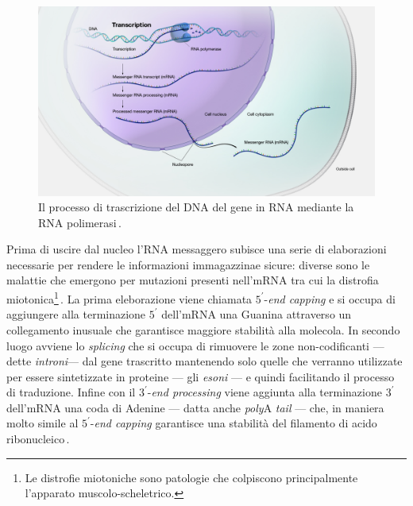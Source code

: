 \begin{figure}[b!]
    \centering
    \includegraphics[width=\textwidth]{assets/dna-transcription.jpg}
    \caption[Il processo di trascrizione del DNA in RNA.]{Il processo di trascrizione del DNA del gene in RNA mediante la RNA polimerasi\,\cite{nhgri_transcription_image}.}\label{fig:dna-transcription}
\end{figure}

Prima di uscire dal nucleo l'RNA messaggero subisce una serie di elaborazioni necessarie per rendere le informazioni immagazzinae sicure: diverse sono le malattie che emergono per mutazioni presenti nell'mRNA tra cui la distrofia miotonica\footnote{Le distrofie miotoniche sono patologie che colpiscono principalmente l'apparato muscolo-scheletrico.}\,\cite{philips2000rna}. La prima eleborazione viene chiamata $5^\prime$-\textit{end capping} e si occupa di aggiungere alla terminazione $5^\prime$ dell'mRNA una Guanina attraverso un collegamento inusuale che garantisce maggiore stabilità alla molecola. In secondo luogo avviene lo \textit{splicing} che si occupa di rimuovere le zone non-codificanti — dette \textsl{introni}— dal gene trascritto mantenendo solo quelle che verranno utilizzate per essere sintetizzate in proteine — gli \textsl{esoni} — e quindi facilitando il processo di traduzione. Infine con il $3^\prime$-\textit{end processing} viene aggiunta alla terminazione $3^\prime$ dell'mRNA una coda di Adenine — datta anche \textit{poly}A \textit{tail} — che, in maniera molto simile al $5^\prime$-\textit{end capping} garantisce una stabilità del filamento di acido ribonucleico\,\cite{hocine2010rna, livingstone2010mechanisms}.

